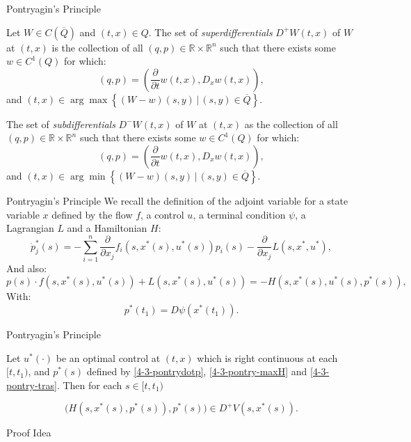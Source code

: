 \documentclass[10pt, compress]{beamer}
\newcommand{\R}{\mathbb{R}}
\begin{document}
\begin{frame}{Pontryagin's Principle}
\begin{definition}
    Let $W\in C(\overline{Q})$ and $(t,x)\in Q$. The set of \textit{superdifferentials} $D^+W(t,x)$ of $W$ at $(t,x)$ is the collection of all $(q,p)\in\R\times\R^n$ such that there exists some $w\in C^1(Q)$ for which:
    \begin{equation}
        (q,p) = \left(\frac{\partial}{\partial t}w(t,x),D_x w(t,x)\right),
    \end{equation}
    and $(t,x) \in \arg \max \left\{(W-w)(s,y)\,|\,(s,y)\in\overline{Q}\right\}.$
        
    The set of \textit{subdifferentials} $D^-W(t,x)$ of $W$ at $(t,x)$ as the collection of all $(q,p)\in\R\times\R^n$ such that there exists some $w\in C^1(Q)$ for which:
    \begin{equation}
        (q,p) = \left(\frac{\partial}{\partial t}w(t,x),D_x w(t,x)\right),
    \end{equation}
    and $(t,x) \in \arg \min \left\{(W-w)(s,y)\,|\,(s,y)\in\overline{Q}\right\}.$
\end{definition}
\end{frame}


\begin{frame}{Pontryagin's Principle}
    We recall the definition of the adjoint variable for a state variable $x$ defined by the flow $f$, a control $u$, a terminal condition $\psi$, a Lagrangian $L$ and a Hamiltonian $H$:
\begin{equation}\label{4-3-pontrydotp}
    \dot{p}_j^{\ast}(s) =  - \sum_{i=1}^n \frac{\partial}{\partial x_{j}}f_i(s,x^{\ast}(s),u^{\ast}(s))p_i(s) - \frac{\partial}{\partial x_{j}} L(s,x^{\ast},u^{\ast})  ,
\end{equation}
And also:
\begin{equation}\label{4-3-pontry-maxH}
    p(s)\cdot f(s,x^{\ast}(s),u^{\ast}(s)) + L(s,x^{\ast}(s),u^{\ast}(s)) = -H(s,x^{\ast}(s),u^{\ast}(s),p^{\ast}(s)),
\end{equation}
With:
\begin{equation}\label{4-3-pontry-trans}
    p^{\ast}(t_1) = D \psi(x^{\ast}(t_1)).
\end{equation}
\end{frame}

\begin{frame}{Pontryagin's Principle}
    \begin{theorem}
    Let $u^{\ast}(\cdot)$ be an optimal control at $(t,x)$ which is right continuous at each $[t,t_1)$, and $p^{\ast}(s)$ defined by \ref{4-3-pontrydotp}, \ref{4-3-pontry-maxH} and \ref{4-3-pontry-tras}. 
    Then for each $s\in[t,t_1)$ 
    
    \begin{equation}
        \bigg(H(s,x^{\ast}(s),p^{\ast}(s)),p^{\ast}(s)\bigg) \in D^+V(s,x^{\ast}(s)).
    \end{equation}
\end{theorem}
\end{frame}

\begin{frame}{Proof Idea}
    
\end{frame}
\end{document}

